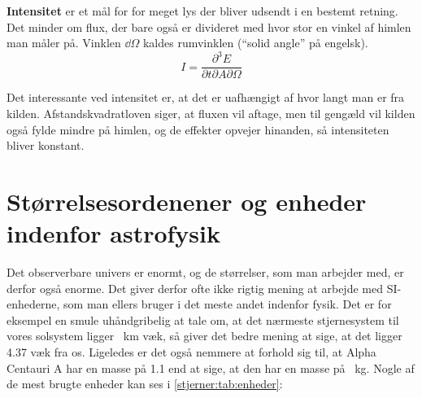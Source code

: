 \documentclass[crop=false, class=memoir]{standalone}
\begin{document}
\textbf{Intensitet} er et mål for for meget lys der bliver udsendt i en bestemt retning. Det minder om flux, der bare også er divideret med hvor stor en vinkel af himlen man måler på. Vinklen $\dd{\Omega}$ kaldes rumvinklen (``solid angle'' på engelsk). 
\begin{equation}
    I = \frac{\partial^3E}{\partial t \partial A \partial\Omega}
\end{equation}

Det interessante ved intensitet er, at det er uafhængigt af hvor langt man er fra kilden. Afstandskvadratloven siger, at fluxen vil aftage, men til gengæld vil kilden også fylde mindre på himlen, og de effekter opvejer hinanden, så intensiteten bliver konstant.

\section{Størrelsesordenener og enheder indenfor astrofysik}
Det observerbare univers er enormt, og de størrelser, som man arbejder med, er derfor også enorme. Det giver derfor ofte ikke rigtig mening at arbejde med SI-enhederne, som man ellers bruger i det meste andet indenfor fysik. Det er for eksempel en smule uhåndgribelig at tale om, at det nærmeste stjernesystem til vores solsystem ligger \SI{}{\kilo\meter} væk, så giver det bedre mening at sige, at det ligger \SI{4.37}{\lightyear} væk fra os. Ligeledes er det også nemmere at forhold sig til, at Alpha Centauri A har en masse på \SI{1.1}{\solarmass} end at sige, at den har en masse på \SI{}{\kilo\gram}. Nogle af de mest brugte enheder kan ses i \cref{stjerner:tab:enheder}: 
\end{document}
